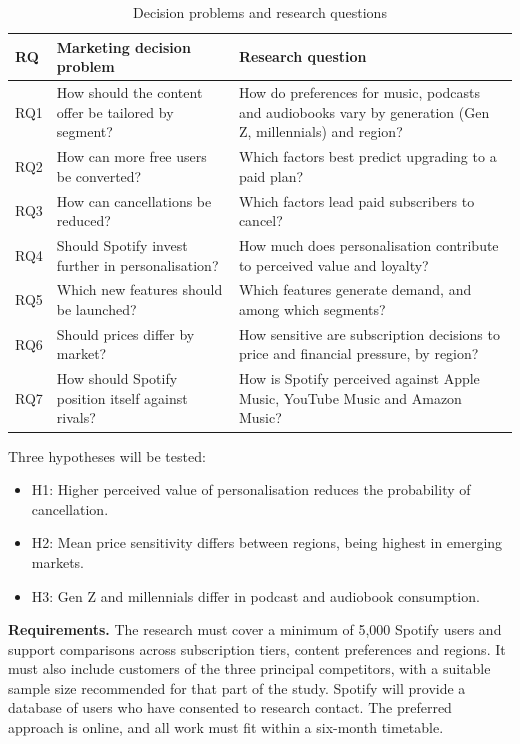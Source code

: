 \documentclass[11pt,a4paper]{article}
\begin{document}
{\small
\begin{longtable}{>{\raggedright\arraybackslash}p{0.1\dimexpr\textwidth-6\tabcolsep\relax}>{\raggedright\arraybackslash}p{0.39\dimexpr\textwidth-6\tabcolsep\relax}>{\raggedright\arraybackslash}p{0.43\dimexpr\textwidth-6\tabcolsep\relax}}
\caption{Decision problems and research questions}\\
\toprule
\textbf{RQ} & \textbf{Marketing decision problem} & \textbf{Research question} \\
\midrule
\endhead
RQ1 & How should the content offer be tailored by segment? & How do preferences for music, podcasts and audiobooks vary by generation (Gen Z, millennials) and region? \\
RQ2 & How can more free users be converted? & Which factors best predict upgrading to a paid plan? \\
RQ3 & How can cancellations be reduced? & Which factors lead paid subscribers to cancel? \\
RQ4 & Should Spotify invest further in personalisation? & How much does personalisation contribute to perceived value and loyalty? \\
RQ5 & Which new features should be launched? & Which features generate demand, and among which segments? \\
RQ6 & Should prices differ by market? & How sensitive are subscription decisions to price and financial pressure, by region? \\
RQ7 & How should Spotify position itself against rivals? & How is Spotify perceived against Apple Music, YouTube Music and Amazon Music? \\
\bottomrule
\end{longtable}
}
Three hypotheses will be tested:

\begin{itemize}
\item H1: Higher perceived value of personalisation reduces the probability of cancellation.
\item H2: Mean price sensitivity differs between regions, being highest in emerging markets.
\item H3: Gen Z and millennials differ in podcast and audiobook consumption.
\end{itemize}
\textbf{Requirements.} The research must cover a minimum of 5,000 Spotify users and support comparisons across subscription tiers, content preferences and regions. It must also include customers of the three principal competitors, with a suitable sample size recommended for that part of the study. Spotify will provide a database of users who have consented to research contact. The preferred approach is online, and all work must fit within a six-month timetable.
\end{document}
